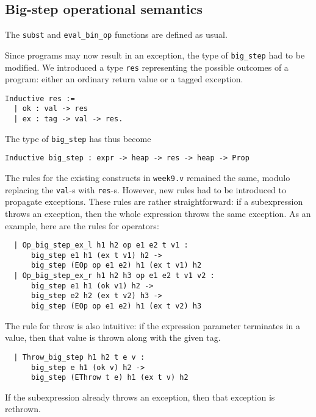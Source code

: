 \documentclass{article}
\begin{document}
\subsection{Big-step operational semantics}

The \texttt{subst} and \texttt{eval\_bin\_op} functions are defined as usual. 

Since programs may now result in an exception, the type of \texttt{big\_step} had to be modified. We introduced a type \texttt{res} representing the possible
outcomes of a program: either an ordinary return value or a tagged exception.
\begin{lstlisting}
Inductive res :=
  | ok : val -> res
  | ex : tag -> val -> res.
\end{lstlisting}
The type of \texttt{big\_step} has thus become
\begin{lstlisting}
Inductive big_step : expr -> heap -> res -> heap -> Prop
\end{lstlisting}	

The rules for the existing constructs in \texttt{week9.v} remained the same, modulo replacing the \texttt{val}-s with \texttt{res}-s. However, new rules had to be
introduced to propagate exceptions. These rules are rather straightforward: if a subexpression throws an exception, then the whole expression
throws the same exception. As an example, here are the rules for operators:
\begin{lstlisting}
  | Op_big_step_ex_l h1 h2 op e1 e2 t v1 :
      big_step e1 h1 (ex t v1) h2 ->
      big_step (EOp op e1 e2) h1 (ex t v1) h2
  | Op_big_step_ex_r h1 h2 h3 op e1 e2 t v1 v2 :
      big_step e1 h1 (ok v1) h2 ->
      big_step e2 h2 (ex t v2) h3 ->
      big_step (EOp op e1 e2) h1 (ex t v2) h3
\end{lstlisting}
The rule for throw is also intuitive: if the expression parameter terminates in a value, then that value is thrown along with the given tag.
\begin{lstlisting}
  | Throw_big_step h1 h2 t e v :
      big_step e h1 (ok v) h2 ->
      big_step (EThrow t e) h1 (ex t v) h2
\end{lstlisting}
If the subexpression already throws an exception, then that exception is rethrown.
\end{document}
